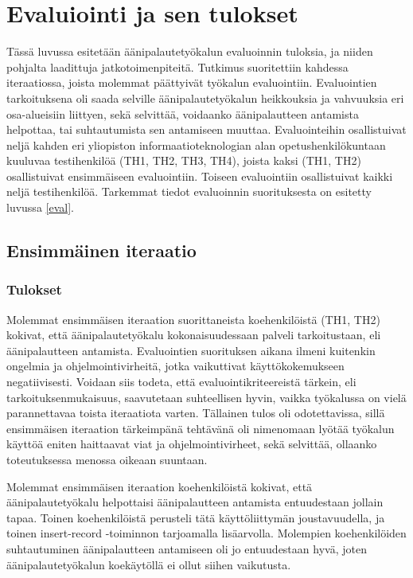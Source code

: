 \documentclass[utf8]{gradu3}
\begin{document}
%

\chapter{Evaluiointi ja sen tulokset}

Tässä luvussa esitetään äänipalautetyökalun evaluoinnin tuloksia, ja niiden pohjalta laadittuja jatkotoimenpiteitä. Tutkimus suoritettiin kahdessa iteraatiossa, joista molemmat päättyivät työkalun evaluointiin. Evaluointien tarkoituksena oli saada selville äänipalautetyökalun heikkouksia ja vahvuuksia eri osa-alueisiin liittyen, sekä selvittää, voidaanko äänipalautteen antamista helpottaa, tai suhtautumista sen antamiseen muuttaa. Evaluointeihin osallistuivat neljä kahden eri yliopiston informaatioteknologian alan opetushenkilökuntaan kuuluvaa testihenkilöä (TH1, TH2, TH3, TH4), joista kaksi (TH1, TH2) osallistuivat ensimmäiseen evaluointiin. Toiseen evaluointiin osallistuivat kaikki neljä testihenkilöä. Tarkemmat tiedot evaluoinnin suorituksesta on esitetty luvussa \ref{eval}.

\section{Ensimmäinen iteraatio}

\subsection{Tulokset}

Molemmat ensimmäisen iteraation suorittaneista koehenkilöistä (TH1, TH2) kokivat, että äänipalautetyökalu kokonaisuudessaan palveli tarkoitustaan, eli äänipalautteen antamista. Evaluointien suorituksen aikana ilmeni kuitenkin ongelmia ja ohjelmointivirheitä, jotka vaikuttivat käyttökokemukseen negatiivisesti. Voidaan siis todeta, että evaluointikriteereistä tärkein, eli tarkoituksenmukaisuus, saavutetaan suhteellisen hyvin, vaikka työkalussa on vielä parannettavaa toista iteraatiota varten. Tällainen tulos oli odotettavissa, sillä ensimmäisen iteraation tärkeimpänä tehtävänä oli nimenomaan lyötää työkalun käyttöä eniten haittaavat viat ja ohjelmointivirheet, sekä selvittää, ollaanko toteutuksessa menossa oikeaan suuntaan.

Molemmat ensimmäisen iteraation koehenkilöistä kokivat, että äänipalautetyökalu helpottaisi äänipalautteen antamista entuudestaan jollain tapaa. Toinen koehenkilöistä perusteli tätä käyttöliittymän joustavuudella, ja toinen insert-record -toiminnon tarjoamalla lisäarvolla. Molempien koehenkilöiden suhtautuminen äänipalautteen antamiseen oli jo entuudestaan hyvä, joten äänipalautetyökalun koekäytöllä ei ollut siihen vaikutusta.
\end{document}
